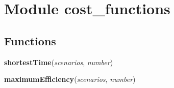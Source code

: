 %
%
%


\section{Module cost\_functions}

    \label{cost_functions}


  \subsection{Functions}

    \label{cost_functions:shortestTime}

    \vspace{0.5ex}

\hspace{.8\funcindent}\begin{boxedminipage}{\funcwidth}

    \raggedright \textbf{shortestTime}(\textit{scenarios}, \textit{number})

\setlength{\parskip}{2ex}
\setlength{\parskip}{1ex}
    \end{boxedminipage}

    \label{cost_functions:maximumEfficiency}

    \vspace{0.5ex}

\hspace{.8\funcindent}\begin{boxedminipage}{\funcwidth}

    \raggedright \textbf{maximumEfficiency}(\textit{scenarios}, \textit{number})

\setlength{\parskip}{2ex}
\setlength{\parskip}{1ex}
    \end{boxedminipage}

